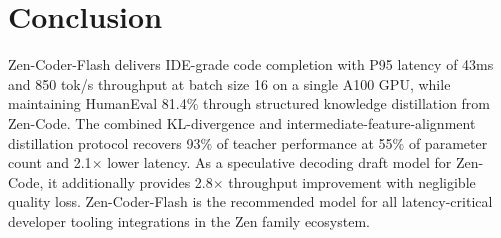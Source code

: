 \documentclass[11pt,a4paper]{article}
\begin{document}
\section{Conclusion}

Zen-Coder-Flash delivers IDE-grade code completion with P95 latency of 43ms and 850 tok/s
throughput at batch size 16 on a single A100 GPU, while maintaining HumanEval 81.4\% through
structured knowledge distillation from Zen-Code. The combined KL-divergence and
intermediate-feature-alignment distillation protocol recovers 93\% of teacher performance
at 55\% of parameter count and 2.1$\times$ lower latency. As a speculative decoding draft
model for Zen-Code, it additionally provides 2.8$\times$ throughput improvement with
negligible quality loss. Zen-Coder-Flash is the recommended model for all latency-critical
developer tooling integrations in the Zen family ecosystem.
\end{document}
